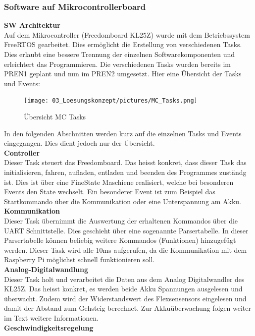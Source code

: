 \subsubsection{Software auf Mikrocontrollerboard}

\textbf{SW Architektur}\\[0.2cm]
Auf dem Mikrocontroller (Freedomboard KL25Z) wurde mit dem Betriebssystem FreeRTOS gearbeitet. Dies ermöglicht die Erstellung von verschiedenen Tasks. Dies erlaubt eine bessere Trennung der einzelnen Softwarekomponenten und erleichtert das Programmieren. Die verschiedenen Tasks wurden bereits im PREN1 geplant und nun im PREN2 umgesetzt. 
Hier eine Übersicht der Tasks und Events:

\begin{figure}[H]
	\centering
	\texttt{[image: 03\_Loesungskonzept/pictures/MC\_Tasks.png]}
	\caption{Übersicht MC Tasks}
\end{figure}
In den folgenden Abschnitten werden kurz auf die einzelnen Tasks und Events eingegangen. Dies dient jedoch nur der Übersicht.\\
\textbf{Controller}\\[0.2cm]
Dieser Task steuert das Freedomboard. Das heisst konkret, dass dieser Task das initialisieren, fahren, aufladen, entladen  und beenden des Programmes zuständg ist. Dies ist über eine FineState Maschiene realisiert, welche bei besonderen Events den State wechselt. Ein besonderer Event ist zum Beispiel das Startkommando über die Kommunikation oder eine Unterspannung am Akku.\\[0.2cm]
\textbf{Kommunikation}\\[0.2cm]
Dieser Task übernimmt die Auswertung der erhaltenen Kommandos über die UART Schnittstelle. Dies geschieht über eine sogenannte Parsertabelle. In dieser Parsertabelle können beliebig weitere Kommandos (Funktionen) hinzugefügt werden. Dieser Task wird alle 10ms aufgerufen, da die Kommunikation mit dem Raspberry Pi möglichst schnell funktionieren soll.\\[0.2cm]
\textbf{Analog-Digitalwandlung}\\[0.2cm]
Dieser Task holt und verarbeitet die Daten aus dem Analog Digitalwandler des KL25Z. Das heisst konkret, es werden beide Akku Spannungen ausgelesen und überwacht. Zudem wird der Widerstandswert des Flexsensensors eingelesen und damit der Abstand zum Gehsteig berechnet. Zur Akkuüberwachung folgen weiter im Text weitere Informationen.\\[0.2cm]
\textbf{Geschwindigkeitsregelung}\\[0.2cm]

